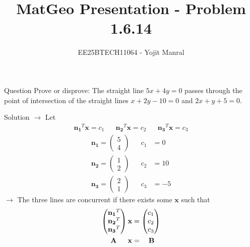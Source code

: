\documentclass{beamer}
\title{MatGeo Presentation - Problem 1.6.14}
\author{EE25BTECH11064 - Yojit Manral}
\date{}
\numberwithin{equation}{section}
\theoremstyle{remark}
\newcommand{\myvec}[1]{\ensuremath{\begin{pmatrix}#1\end{pmatrix}}}
\let\vec\mathbf
\begin{document}
\frame{\titlepage}
\begin{frame}{Question}
Prove or disprove: The straight line $5x + 4y = 0$ passes through the point of intersection of the straight lines $x + 2y - 10 = 0$ and $2x + y + 5 = 0$.
\end{frame}

\begin{frame}{Solution}
$\rightarrow$ Let
\begin{align*}
    \vec{n_1}^T\vec{x} = c_1 && \vec{n_2}^T\vec{x} = c_2 && \vec{n_3}^T\vec{x} = c_3
\end{align*}
\begin{align}
    \vec{n_1} = \myvec{5\\4} && c_1 &= 0 \\
    \vec{n_2} = \myvec{1\\2} && c_2 &= 10 \\
    \vec{n_3} = \myvec{2\\1} && c_3 &= -5
\end{align}
$\rightarrow$ The three lines are concurrent if there exists some $\vec{x}$ such that
\begin{align}
    \myvec{\vec{n_1}^T\\\vec{n_2}^T\\\vec{n_3}^T} \vec{x} &= \myvec{c_1\\c_2\\c_3} \\
    \vec{A}\hspace{0.55cm}\vec{x} &= \hspace{0.35cm}\vec{B}
\end{align}
\end{frame}
\end{document}
